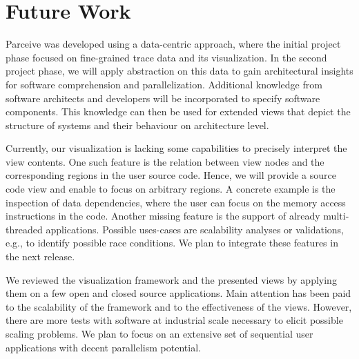 \section{Future Work}
\label{sec:future_work}
Parceive was developed using a data-centric approach, where the initial project
phase focused on fine-grained trace data and its visualization. In the second
project phase, we will apply abstraction on this data to gain architectural
insights for software comprehension and parallelization. Additional knowledge
from software architects and developers will be incorporated to specify
software components. This knowledge can then be used for extended views that
depict the structure of systems and their behaviour on architecture level.

Currently, our visualization is lacking some capabilities to precisely
interpret the view contents. One such feature is the relation between view
nodes and the corresponding regions in the user source code. Hence, we will
provide a source code view and enable to focus on arbitrary regions. A concrete
example is the inspection of data dependencies, where the user can focus on
the memory access instructions in the code. Another missing feature is the
support of already multi-threaded applications. Possible uses-cases are
scalability analyses or validations, e.g., to identify possible race
conditions. We plan to integrate these features in the next release.

We reviewed the visualization framework and the presented views by applying 
them on a few open and closed source applications. Main attention has been paid
to the scalability of the framework and to the effectiveness of the views.
However, there are more tests with software at industrial scale necessary to
elicit possible scaling problems. We plan to focus on an extensive set of
sequential user applications with decent parallelism potential.
